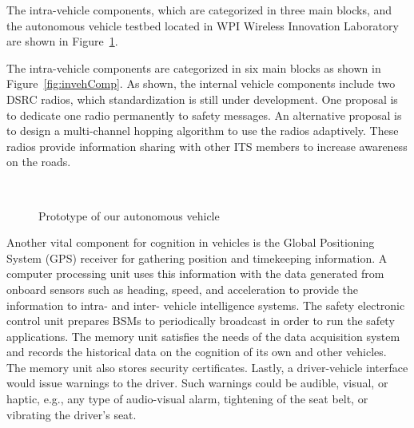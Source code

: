 \documentclass[journal, 11pt]{IEEEtran}
\begin{document}
{\color{red}The intra-vehicle components, which are categorized in three main
blocks, and the autonomous vehicle testbed located in WPI Wireless Innovation
Laboratory are shown in Figure~\ref{fig:overall-prototype}.}

The intra-vehicle components
are categorized in six main blocks as shown in Figure~\ref{fig:invehComp}. As
shown, the internal vehicle components include two DSRC radios, which
standardization is still under development. One proposal is to dedicate one
radio permanently to safety messages. An alternative proposal is to design a
multi-channel hopping algorithm to use the radios adaptively. These radios
provide information sharing with other ITS members to increase awareness on the
roads.

\begin{figure}[ht]
  \quad
  ~
  ~
  \vspace*{-4mm}
  \caption{Prototype of our autonomous vehicle}
  \label{fig:overall-prototype}
  \vspace*{-6mm}
\end{figure}

Another vital component for cognition in vehicles is the Global Positioning
System (GPS) receiver for gathering position and timekeeping information. A
computer processing unit uses this information with the data generated from
onboard sensors such as heading, speed, and acceleration to provide the
information to intra- and inter- vehicle intelligence systems. The safety
electronic control unit prepares BSMs to periodically broadcast in order to run
the safety applications. The memory unit satisfies the needs of the data
acquisition system and records the historical data on the cognition of its
own and other vehicles. The memory unit also stores security certificates.
Lastly, a driver-vehicle interface would issue warnings to the driver. Such
warnings could be audible, visual, or haptic, e.g., any type of audio-visual
alarm, tightening of the seat belt, or vibrating the driver's seat.
\end{document}
